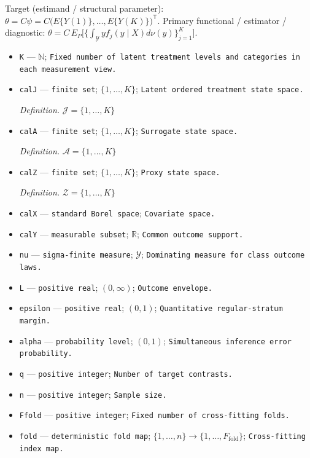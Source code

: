 \documentclass{article}
\begin{document}
Target (estimand / structural parameter): \(\theta=C\psi=C\bigl(E\{Y(1)\},\ldots,E\{Y(K)\}\bigr)^{\mathsf T}\).
Primary functional / estimator / diagnostic: \(\theta=C\,E_P\bigl[\bigl\{\int_{\mathcal Y}y f_j(y\mid X)d\nu(y)\bigr\}_{j=1}^{K}\bigr]\).
\begin{itemize}
  \item \texttt{K} --- \(\mathbb N\); \texttt{Fixed number of latent treatment levels and categories in each measurement view.}
  \item \texttt{calJ} --- \texttt{finite set}; \(\{1,\ldots,K\}\); \texttt{Latent ordered treatment state space.}
  \par\smallskip\noindent\emph{Definition.} \(\mathcal J=\{1,\ldots,K\}\)
  \item \texttt{calA} --- \texttt{finite set}; \(\{1,\ldots,K\}\); \texttt{Surrogate state space.}
  \par\smallskip\noindent\emph{Definition.} \(\mathcal A=\{1,\ldots,K\}\)
  \item \texttt{calZ} --- \texttt{finite set}; \(\{1,\ldots,K\}\); \texttt{Proxy state space.}
  \par\smallskip\noindent\emph{Definition.} \(\mathcal Z=\{1,\ldots,K\}\)
  \item \texttt{calX} --- \texttt{standard Borel space}; \texttt{Covariate space.}
  \item \texttt{calY} --- \texttt{measurable subset}; \(\mathbb R\); \texttt{Common outcome support.}
  \item \texttt{nu} --- \texttt{sigma-\allowbreak{}finite measure}; \(\mathcal Y\); \texttt{Dominating measure for class outcome laws.}
  \item \texttt{L} --- \texttt{positive real}; \((0,\infty)\); \texttt{Outcome envelope.}
  \item \texttt{epsilon} --- \texttt{positive real}; \((0,1)\); \texttt{Quantitative regular-\allowbreak{}stratum margin.}
  \item \texttt{alpha} --- \texttt{probability level}; \((0,1)\); \texttt{Simultaneous inference error probability.}
  \item \texttt{q} --- \texttt{positive integer}; \texttt{Number of target contrasts.}
  \item \texttt{n} --- \texttt{positive integer}; \texttt{Sample size.}
  \item \texttt{Ffold} --- \texttt{positive integer}; \texttt{Fixed number of cross-\allowbreak{}fitting folds.}
  \item \texttt{fold} --- \texttt{deterministic fold map}; \(\{1,\ldots,n\}\to\{1,\ldots,F_{\mathrm{fold}}\}\); \texttt{Cross-\allowbreak{}fitting index map.}

\end{itemize}
\end{document}
